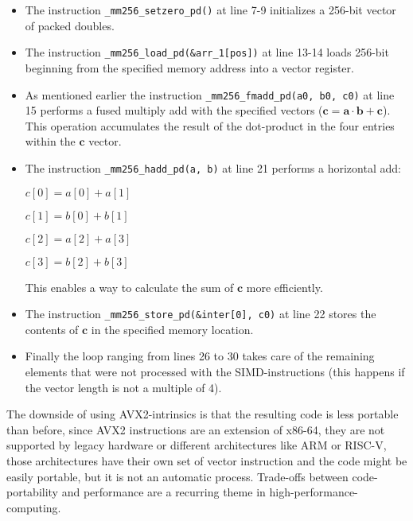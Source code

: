 \documentclass[english,11pt,a4paper,table]{article} %
\begin{document}
\begin{itemize}
	\item The instruction \texttt{\_mm256\_setzero\_pd()} at line 7-9 initializes a 256-bit vector of packed doubles.
	\item The instruction \texttt{\_mm256\_load\_pd(\&arr\_1[pos])} at line 13-14 loads 256-bit beginning from the specified memory address into a vector register.
	\item As mentioned earlier the instruction \texttt{\_mm256\_fmadd\_pd(a0, b0, c0)} at line 15 performs a fused multiply add with the specified vectors ($\mathbf{c} = \mathbf{a} \cdot \mathbf{b} + \mathbf{c}$). This operation accumulates the result of the dot-product in the four entries within the $\mathbf{c}$ vector.
	      \item{ The instruction \texttt{\_mm256\_hadd\_pd(a, b)} at line 21 performs a horizontal add:

	                  $c[0] = a[0] + a[1]$

	                  $c[1] = b[0] + b[1]$

	                  $c[2] = a[2] + a[3]$

	                  $c[3] = b[2] + b[3]$

	                  This enables a way to calculate the sum of $\mathbf{c}$ more efficiently.
	            }
	\item The instruction \texttt{\_mm256\_store\_pd(\&inter[0], c0)} at line 22 stores the contents of $\mathbf{c}$ in the specified memory location.
	\item Finally the loop ranging from lines 26 to 30 takes care of the remaining elements that were not processed with the SIMD-instructions (this happens if the vector length is not a multiple of 4).
\end{itemize}

The downside of using AVX2-intrinsics is that the resulting code is less portable than before, since AVX2 instructions are an extension of x86-64, they are not supported by legacy hardware or different architectures like ARM or RISC-V, those architectures have their own set of vector instruction and the code might be easily portable, but it is not an automatic process.
Trade-offs between code-portability and performance are a recurring theme in high-performance-computing.
\end{document}
